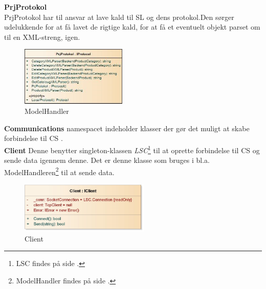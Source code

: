  
 
 
 

\textbf{PrjProtokol}\\
PrjProtokol har til ansvar at lave kald til \gls{SL} og dens protokol.Den sørger udelukkende for at få lavet de rigtige kald, for at få et eventuelt objekt parset om til en XML-streng, igen. \bigskip
\begin{center}
\begin{figure}[!h]
    \centering
    \includegraphics[width=0.45\textwidth]{Systemdesign/backend/klassebeskrivelser/Images/PrjProtokol.png}
    \caption{ModelHandler}
    \label{fig:modelhandler}
\end{figure}
\end{center}
\label{Modelhandler_Beskrivelse}
 \bigskip
 

\bigskip
\bigskip
\textbf{Communications} namespacet indeholder klasser der gør det muligt at skabe forbindelse til \gls{CS} .\\

\textbf{Client}
Denne benytter singleton-klassen \textit{LSC}\footnote{LSC findes på side \pageref{LSC_Beskrivelse}.} til at oprette forbindelse til \gls{CS} og sende data igennem denne. Det er denne klasse som bruges i bl.a. ModelHandleren{\footnote{ModelHandler findes på side \pageref{Modelhandler_Beskrivelse}.}} til at sende data.
\begin{center}
\begin{figure}[!h]
    \centering
    \includegraphics[width=0.55\textwidth]{Systemdesign/backend/klassebeskrivelser/Images/Client.png}
    \caption{Client}
    \label{fig:modelhandler}
\end{figure}
\end{center}
\label{Modelhandler_Beskrivelse}
 \bigskip 


